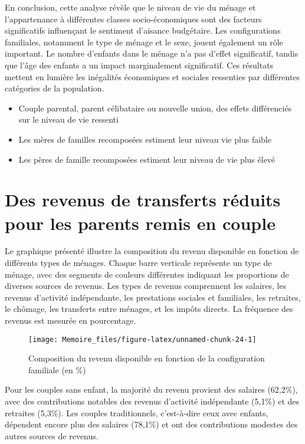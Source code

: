 \documentclass[
  12pt,
]{book}
\begin{document}
En conclusion, cette analyse révèle que le niveau de vie du ménage et
l'appartenance à différentes classes socio-économiques sont des facteurs
significatifs influençant le sentiment d'aisance budgétaire. Les
configurations familiales, notamment le type de ménage et le sexe,
jouent également un rôle important. Le nombre d'enfants dans le ménage
n'a pas d'effet significatif, tandis que l'âge des enfants a un impact
marginalement significatif. Ces résultats mettent en lumière les
inégalités économiques et sociales ressenties par différentes catégories
de la population.

\begin{itemize}
\item
  Couple parental, parent célibataire ou nouvelle union, des effets
  différenciés sur le niveau de vie ressenti
\item
  Les mères de familles recomposées estiment leur niveau vie plus faible
\item
  Les pères de famille recomposées estiment leur niveau de vie plus
  élevé
\end{itemize}

\section{Des revenus de transferts réduits pour les parents remis en
couple}\label{des-revenus-de-transferts-ruxe9duits-pour-les-parents-remis-en-couple}

Le graphique présenté illustre la composition du revenu disponible en
fonction de différents types de ménages. Chaque barre verticale
représente un type de ménage, avec des segments de couleurs différentes
indiquant les proportions de diverses sources de revenus. Les types de
revenus comprennent les salaires, les revenus d'activité indépendante,
les prestations sociales et familiales, les retraites, le chômage, les
transferts entre ménages, et les impôts directs. La fréquence des
revenus est mesurée en pourcentage.

\begin{figure}[h]

{\centering \texttt{[image: Memoire\_files/figure-latex/unnamed-chunk-24-1]} 

}

\caption{Composition du revenu disponible en fonction de la configuration familiale (en \%)}\label{fig:unnamed-chunk-24}
\end{figure}

Pour les couples sans enfant, la majorité du revenu provient des
salaires (62,2\%), avec des contributions notables des revenus
d'activité indépendante (5,1\%) et des retraites (5,3\%). Les couples
traditionnels, c'est-à-dire ceux avec enfants, dépendent encore plus des
salaires (78,1\%) et ont des contributions modestes des autres sources
de revenus.
\end{document}
